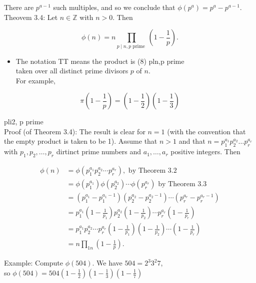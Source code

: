 \documentclass[10pt]{article}
\begin{document}
There are $p^{a-1}$ such multiples, and so we conclude that $\phi\left(p^{a}\right)=p^{a}-p^{a-1}$.\\
Theovem 3.4: Let $n \in \mathbb{Z}$ with $n>0$. Then

$$
\phi(n)=n \prod_{p \mid n, p \text { prime }}\left(1-\frac{1}{p}\right) .
$$

\begin{itemize}
  \item The notation TT means the product is (8) pln,p prime\\
taken over all distinct prime divisors $p$ of $n$.\\
For example,
\end{itemize}

$$
\pi\left(1-\frac{1}{p}\right)=\left(1-\frac{1}{2}\right)\left(1-\frac{1}{3}\right)
$$

pli2, p prime\\
Proof (of Theorem 3.4): The result is clear for $n=1$ (with the convention that the empty product is taken to be 1). Assume that $n>1$ and that $n=p_{1}^{a_{1}} p_{2}^{a_{2}} \ldots p_{r}^{a_{r}}$ with $p_{1}, p_{2}, \ldots, p_{r}$ dirtinct prime numbers and $a_{1}, \ldots, a_{r}$ positive integers. Then

$$
\begin{aligned}
\phi(n) & =\phi\left(p_{1}^{a_{1}} p_{2}^{a_{2}} \cdots p_{r}^{a_{r}}\right), \text { by Theorem } 3.2 \\
& =\phi\left(p_{1}^{a_{1}}\right) \phi\left(p_{2}^{a_{2}}\right) \cdots \phi\left(p_{r}^{a_{r}}\right) \text { by Theorem } 3.3 \\
& =\left(p_{1}^{a_{1}}-p_{1}^{a_{1}-1}\right)\left(p_{2}^{a_{2}}-p_{2}^{a_{2}-1}\right) \cdots\left(p_{r}^{a_{r}}-p_{r}^{a_{r}-1}\right) \\
& =p_{1}^{a_{1}}\left(1-\frac{1}{p_{1}}\right) p_{2}^{a_{2}}\left(1-\frac{1}{p_{2}}\right) \cdots p_{r}^{a_{r}}\left(1-\frac{1}{p_{r}}\right) \\
& =p_{1}^{a_{1}} p_{2}^{a_{2}} \cdots p_{r}^{a_{r}}\left(1-\frac{1}{p_{1}}\right)\left(1-\frac{1}{p_{2}}\right) \cdots\left(1-\frac{1}{p_{r}}\right) \\
& =n \prod_{1 n}\left(1-\frac{1}{p}\right) .
\end{aligned}
$$

Example: Compute $\phi(504)$. We have $504=2^{3} 3^{2} 7$,\\
so $\phi(504)=504\left(1-\frac{1}{2}\right)\left(1-\frac{1}{3}\right)\left(1-\frac{1}{7}\right)$
\end{document}
